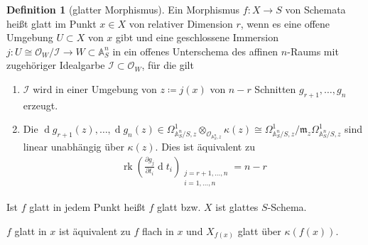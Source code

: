 \documentclass[english, german, parskip=half]{scrreprt}
\theoremstyle{definition}
\newtheorem{Definition}[Satz]{Definition}
\theoremstyle{remark}
\newcommand*{\A}{\ensuremath{\mathds{A}}} %
\renewcommand*{\m}{\mathfrak{m}} %
\renewcommand*{\k}{\kappa} %
\renewcommand*{\O}{\mathcal{O}} %
\newcommand*{\I}{\mathcal{I}} %
\newcommand*{\Om}[1]{\ensuremath{\Omega_{#1}^1}} %
\renewcommand*{\d}{\ensuremath{\operatorname{d}}} %
\DeclareMathOperator{\rk}{rk} %
\begin{document}
\begin{Definition}[glatter Morphismus]
  Ein Morphismus $f\colon X\to S$ von Schemata heißt glatt im Punkt
  $x\in X$ von relativer Dimension $r$, wenn es eine offene Umgebung
  $U\subset X$ von $x$ gibt und eine geschlossene Immersion $j\colon
  U\cong\O_W/\I\to W\subset\A_S^n$ in ein offenes Unterschema des affinen
  $n$-Raums mit zugehöriger Idealgarbe $\I\subset\O_W$, für die
  gilt
  \begin{enumerate}[label=(\alph*)]
  \item $\I$ wird in einer Umgebung von $z\coloneqq j(x)$ von $n-r$ Schnitten
    $g_{r+1},\dotsc,g_{n}$ erzeugt.
  \item Die $\d g_{r+1}(z),\dotsc,\d g_{n}(z)\in 
    \Om{\A_S^n/S,z} \otimes_{\O_{\A_S^n,z}} \k(z)
    \cong \Om{\A_S^n/S,z}/\m_z\Om{\A_S^n/S,z}$ 
    sind linear unabhängig über $\k(z)$.
    Dies ist äquivalent zu
    \begin{gather*}\tag{Jacobi Bedingung}
      \rk\left(
        \frac{\partial g_j}{\partial t_i}\d t_i 
      \right)_{\substack{j=r+1,\dotsc,n\\i=1,\dotsc,n\phantom{+1}}}
      = n-r
    \end{gather*}
  \end{enumerate}
  Ist $f$ glatt in jedem Punkt heißt $f$ glatt bzw. $X$ ist glattes
  $S$-Schema.  
  \cite[siehe][8.5, Definition 1]{bosch}

  $f$ glatt in $x$ ist äquivalent zu $f$ flach in $x$ und $X_{f(x)}$
  glatt über $\k(f(x))$.
  \cite[siehe][8.5, Proposition 17]{bosch}
\end{Definition}
\end{document}

